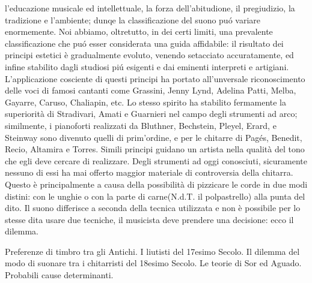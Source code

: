 \documentclass[
10pt, %
a4paper, %
oneside, %
headinclude,footinclude, %
BCOR5mm, %
]{scrartcl}
\begin{document}
{l'educazione musicale ed intellettuale, la forza dell'abitudione, il pregiudizio, la tradizione e l'ambiente; dunqe la classificazione del suono puó variare enormemente. Noi abbiamo, oltretutto, in dei certi limiti, una prevalente classificazione che puó esser considerata una guida affidabile: il risultato dei principi estetici è gradualmente evoluto, venendo setacciato accuratamente, ed infine stabilito dagli studiosi piú esigenti e dai eminenti interpreti e artigiani. L'applicazione cosciente di questi principi ha portato all'unversale riconoscimento delle voci di famosi cantanti come Grassini, Jenny Lynd, Adelina Patti, Melba, Gayarre, Caruso, Chaliapin, etc. Lo stesso spirito ha stabilito fermamente la superiorità di Stradivari, Amati e Guarnieri nel campo degli strumenti ad arco; similmente, i pianoforti realizzati da Bluthner, Bechstein, Pleyel, Erard, e Steinway sono divenuto quelli di prim'ordine, e per le chitarre di Pagés, Benedit, Recio, Altamira e Torres. Simili principi guidano un artista nella qualità del tono che egli deve cercare di realizzare. Degli strumenti ad oggi conosciuti, sicuramente nessuno di essi ha mai offerto maggior materiale di controversia della chitarra. Questo è principalmente a causa della possibilità di pizzicare le corde in due modi distini: con le unghie o con la parte di carne(N.d.T. il polpastrello) alla punta del dito. Il suono differisce a seconda della tecnica utilizzata e non è possibile per lo stesse dita usare due tecniche, il musicista deve prendere una decisione: ecco il dilemma.

Preferenze di timbro tra gli Antichi. I liutisti del 17esimo Secolo. Il dilemma del modo di suonare tra i chitarristi del 18esimo Secolo. Le teorie di Sor ed Aguado. Probabili cause determinanti.

}
\end{document}
